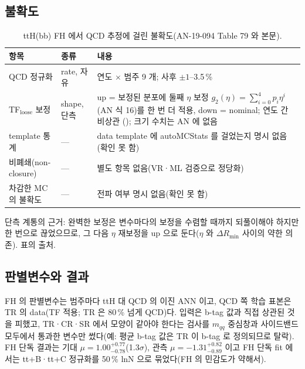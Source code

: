 \subsection{불확도}\label{sec:qcd-tth-unc}
\begin{table}[htbp]\centering
\caption{ttH(bb) FH 에서 QCD 추정에 걸린 불확도(AN-19-094 Table 79 와 본문).}\label{tab:qcd-tth-unc}
\small
\begin{tabularx}{\linewidth}{@{}>{\raggedright\arraybackslash}p{3.6cm}>{\raggedright\arraybackslash}p{3.0cm}L@{}}
\toprule
항목 & 종류 & 내용 \\
\midrule
QCD 정규화 & rate, 자유 & 연도 $\times$ 범주 9 개; 사후 $\pm1$–3.5\,\% \\
TF$_{\text{loose}}$ 보정 & shape, 단측 & up = 보정된 분포에 둘째 $\eta$ 보정 $g_2(\eta)=\sum_{i=0}^{4}p_i\eta^i$(AN 식 16)를 한 번 더 적용, down = nominal; 연도 간 비상관
      (); 크기 수치는 AN 에 없음 \\
template 통계 & — & data template 에 autoMCStats 를 걸었는지 명시 없음(확인 못 함) \\
비폐쇄(non-closure) & — & 별도 항목 없음(VR·ML 검증으로 정당화) \\
차감한 MC 의 불확도 & — & 전파 여부 명시 없음(확인 못 함) \\
\bottomrule
\end{tabularx}
\end{table}
단측 계통의 근거: 완벽한 보정은 변수마다의 보정을 수렴할 때까지 되풀이해야 하지만 한 번으로 끊었으므로, 그 다음 $\eta$ 재보정을 up 으로 둔다($\eta$ 와
$\Delta R_{\min}$ 사이의 약한 의존). 표의 출처.

\subsection{판별변수와 결과}
FH 의 판별변수는 범주마다 ttH 대 QCD 의 이진 ANN 이고, QCD 쪽 학습 표본은 TR 의 data(TF 적용; TR 은 80\,\% 넘게 QCD)다.
입력은 b-tag 값과 직접 상관된 것을 피했고, TR·CR·SR 에서 모양이 같아야 한다는 검사를 $m_{qq}$ 중심창과 사이드밴드 모두에서
통과한 변수만 썼다(예: 평균 b-tag 값은 TR 이 b-tag 로 정의되므로 탈락). FH 단독 결과는 기대 $\mu=1.00^{+0.77}_{-0.78}$(1.3$\sigma$),
관측 $\mu=-1.31^{+0.82}_{-0.89}$ 이고 FH 단독 fit 에서는 tt+B·tt+C 정규화를 50\,\% lnN 으로 묶었다(FH 의 민감도가 약해서).

